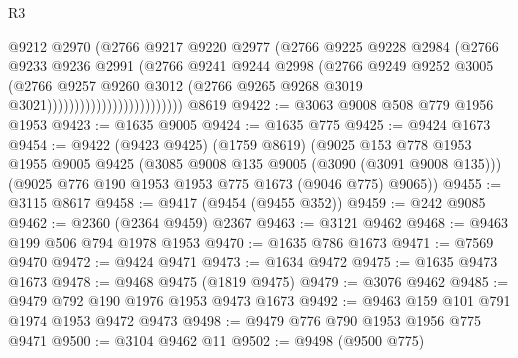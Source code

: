 \begin{lexlean}{R3}
\begin{coremodule}
                                        @9212
                                        @2970
                                        (@2766
                                          @9217
                                          @9220
                                          @2977
                                          (@2766
                                            @9225
                                            @9228
                                            @2984
                                            (@2766
                                              @9233
                                              @9236
                                              @2991
                                              (@2766
                                                @9241
                                                @9244
                                                @2998
                                                (@2766
                                                  @9249
                                                  @9252
                                                  @3005
                                                  (@2766
                                                    @9257
                                                    @9260
                                                    @3012
                                                    (@2766
                                                      @9265
                                                      @9268
                                                      @3019
                                                      @3021)))))))))))))))))))))))))
    @8619
@9422 := @3063 @9008 @508 @779 @1956 @1953
@9423 := @1635 @9005
@9424 := @1635 @775
@9425 := @9424 @1673
@9454 := @9422
    (@9423 @9425)
    (@1759 @8619)
    (@9025
      @153
      @778
      @1953
      @1955
      @9005
      @9425
      (@3085 @9008 @135 @9005 (@3090 (@3091 @9008 @135)))
      (@9025 @776 @190 @1953 @1953 @775 @1673 (@9046 @775) @9065))
@9455 := @3115 @8617
@9458 := @9417 (@9454 (@9455 @352))
@9459 := @242 @9085
@9462 := @2360 (@2364 @9459) @2367
@9463 := @3121 @9462
@9468 := @9463 @199 @506 @794 @1978 @1953
@9470 := @1635 @786 @1673
@9471 := @7569 @9470
@9472 := @9424 @9471
@9473 := @1634 @9472
@9475 := @1635 @9473 @1673
@9478 := @9468 @9475 (@1819 @9475)
@9479 := @3076 @9462
@9485 := @9479 @792 @190 @1976 @1953 @9473 @1673
@9492 := @9463 @159 @101 @791 @1974 @1953 @9472 @9473
@9498 := @9479 @776 @790 @1953 @1956 @775 @9471
@9500 := @3104 @9462 @11
@9502 := @9498 (@9500 @775)

\end{coremodule}
\end{lexlean}
